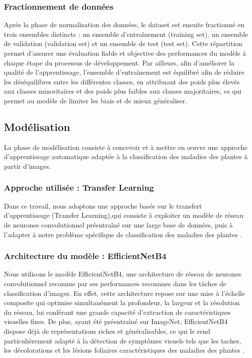 \subsubsection{Fractionnement de données}
Après la phase de normalisation des données, le dataset est ensuite fractionné en trois ensembles distincts : un ensemble d’entraînement (training set), un ensemble de validation (validation set) et un ensemble de test (test set). Cette répartition permet d’assurer une évaluation fiable et objective des performances du modèle à chaque étape du processus de développement. Par ailleurs, afin d’améliorer la qualité de l’apprentissage, l’ensemble d’entraînement est équilibré afin de réduire les déséquilibres entre les différentes classes, en attribuant des poids plus élevés aux classes minoritaires et des poids plus faibles aux classes majoritaires, ce qui permet au modèle de limiter les biais et de mieux généraliser.
\subsection{Modélisation}
La phase de modélisation consiste à concevoir et à mettre en œuvre une approche d’apprentissage automatique adaptée à la classification des maladies des plantes à partir d’images.
\subsubsection{Approche utilisée : Transfer Learning}
Dans ce travail, nous adoptons une approche basée sur le transfert d’apprentissage (Transfer Learning),qui consiste à exploiter un modèle de réseau de neurones convolutionnel préentraîné sur une large base de données, puis à l’adapter à notre problème spécifique de classification des maladies des plantes \cite{transferlearnin}. 
\subsubsection{Architecture du modèle : EfficientNetB4}
Nous utilisons le modèle EfficientNetB4, une architecture de réseau de neurones convolutionnel reconnue par ses performances reconnues dans 
les tâches de classification d'images. En effet, cette architecture repose 
sur une mise à l'échelle composite qui optimise 
simultanément la profondeur, la largeur et la résolution du réseau, lui 
conférant une grande capacité d'extraction de caractéristiques visuelles 
fines. De plus, ayant été préentraîné sur ImageNet, EfficientNetB4 dispose 
déjà de représentations riches et généralisables, ce qui le rend 
particulièrement adapté à la détection de symptômes visuels tels que les 
taches, les décolorations et les lésions foliaires caractéristiques des 
maladies des plantes \cite{EfficientNetB4}. 
